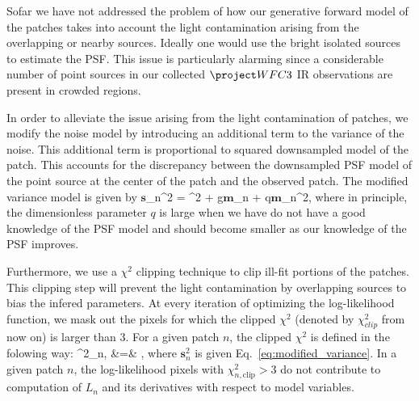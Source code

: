 Sofar we have not addressed the problem of how our generative forward model of the patches takes into account the light contamination arising from 
the overlapping or nearby sources. Ideally one would use the bright isolated sources to estimate the PSF. This issue is particularly alarming since 
a considerable number of point sources in our collected $\wfc$ IR observations are present in crowded regions. 

In order to alleviate the issue arising from the light contamination of patches, we modify the noise model by introducing an additional term to the variance 
of the noise. This additional term is proportional to squared downsampled model of the patch. This accounts for the discrepancy between the downsampled PSF model of the 
point source at the center of the patch and the observed patch. The modified variance model is given by
\beq
$\mathbf{s}$_n^2 = \sigma^{2} + g$\mathbf{m}$_{n} + q$\mathbf{m}$_{n}^{2},
\label{eq:modified_variance}
\eeq 
where in principle, the dimensionless parameter $q$ is large when we have do not have a good knowledge of the PSF model and should become 
smaller as our knowledge of the PSF improves. 

Furthermore, we use a $\chi^2$ clipping technique to clip ill-fit portions of the patches. 
This clipping step will prevent the light contamination by overlapping sources to bias the infered parameters. 
At every iteration of optimizing the log-likelihood function, we mask out the pixels for which the clipped $\chi^{2}$ 
(denoted by $\chi^{2}_{clip}$ from now on) is larger than 3. For a given patch $n$, the clipped $\chi^{2}$ is defined in the folowing way:
\beq
\chi^{2}_{n,} &=& , 
\eeq
where $\mathbf{s}_{n}^{2}$ is given Eq.~\ref{eq:modified_variance}. In a given patch $n$, the log-likelihood pixels with $\chi^{2}_{n,\mathrm{clip}} > 3$ 
do not contribute to computation of $L_n$ and its derivatives with respect to model variables. 


